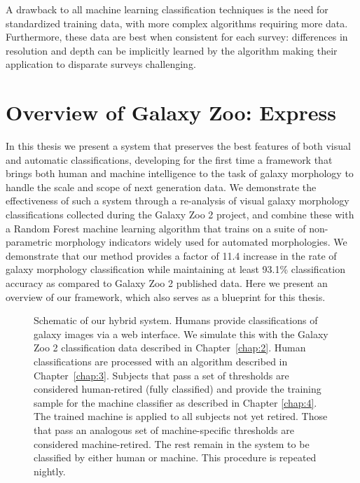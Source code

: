 A drawback to all machine learning classification techniques is the need for standardized training data, with more complex algorithms requiring more data. Furthermore, these data are best when consistent for each survey: differences in resolution and depth can be implicitly learned by the algorithm making their application to disparate surveys challenging. 


\section{Overview of Galaxy Zoo: Express}
\label{chap1: gzx}

In this thesis we present a system that preserves the best features of both visual and automatic classifications, developing for the first time a framework that brings both human and machine intelligence to the task of galaxy morphology to handle the scale and scope of next generation data. We demonstrate the effectiveness of such a system through a re-analysis of visual galaxy morphology classifications collected during the Galaxy Zoo 2 project, and combine these with a Random Forest machine learning algorithm that trains on a suite of non-parametric morphology indicators widely used for automated morphologies.  We demonstrate that our method provides a factor of 11.4 increase in the rate of galaxy morphology classification  while maintaining at least 93.1\% classification accuracy as compared to Galaxy Zoo 2 published data. Here we present an overview of our framework, which also serves as a blueprint for this thesis. 

\begin{figure}
\caption[Schematic of the Galaxy Zoo: Express human+machine hybrid system.]{Schematic of our hybrid system. Humans provide classifications of galaxy images via a web interface. We simulate this with the Galaxy Zoo 2 classification data described in Chapter~\ref{chap:2}. Human classifications are processed with an algorithm described in Chapter~\ref{chap:3}. Subjects that pass a set of thresholds are considered human-retired (fully classified) and provide the training sample for the machine classifier as described in Chapter \ref{chap:4}. The trained machine is applied to all subjects not yet retired. Those that pass an analogous set of machine-specific thresholds are considered machine-retired. The rest remain in the system to be classified by either human or machine. This procedure is repeated  nightly. \label{fig: schematic}}
\end{figure}


